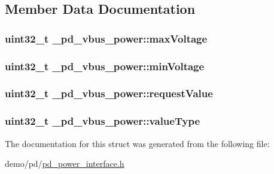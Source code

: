 \subsection{Member Data Documentation}
\hypertarget{struct__pd__vbus__power_a62905771ed26603c0bb6ee9c9a15ce55}{
\subsubsection[{max\-Voltage}]{\setlength{\rightskip}{0pt plus 5cm}uint32\-\_\-t \-\_\-pd\-\_\-vbus\-\_\-power\-::max\-Voltage}}\label{struct__pd__vbus__power_a62905771ed26603c0bb6ee9c9a15ce55}
\hypertarget{struct__pd__vbus__power_a4a38147fb5014bae4ac87fb0e327ea43}{
\subsubsection[{min\-Voltage}]{\setlength{\rightskip}{0pt plus 5cm}uint32\-\_\-t \-\_\-pd\-\_\-vbus\-\_\-power\-::min\-Voltage}}\label{struct__pd__vbus__power_a4a38147fb5014bae4ac87fb0e327ea43}
\hypertarget{struct__pd__vbus__power_a81446f906812d534ba558ac6ce2eb863}{
\subsubsection[{request\-Value}]{\setlength{\rightskip}{0pt plus 5cm}uint32\-\_\-t \-\_\-pd\-\_\-vbus\-\_\-power\-::request\-Value}}\label{struct__pd__vbus__power_a81446f906812d534ba558ac6ce2eb863}
\hypertarget{struct__pd__vbus__power_a7ab0e68db9780ac66f580f2f5c9b7628}{
\subsubsection[{value\-Type}]{\setlength{\rightskip}{0pt plus 5cm}uint32\-\_\-t \-\_\-pd\-\_\-vbus\-\_\-power\-::value\-Type}}\label{struct__pd__vbus__power_a7ab0e68db9780ac66f580f2f5c9b7628}


The documentation for this struct was generated from the following file\-:\begin{DoxyCompactItemize}
\item 
demo/pd/\hyperlink{pd__power__interface_8h}{pd\-\_\-power\-\_\-interface.\-h}\end{DoxyCompactItemize}
